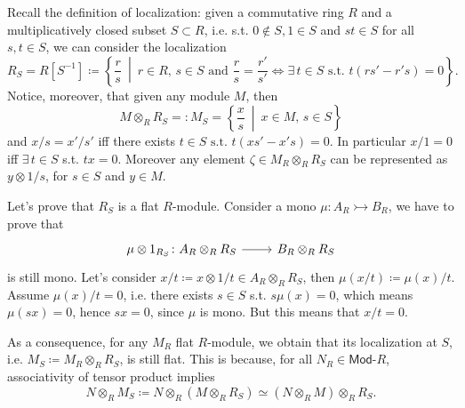 \begin{ex}
	Recall the definition of localization:
	given a commutative ring $R$ and a multiplicatively closed subset $S \subset R$, 
	i.e. s.t. $0 \notin S, 1 \in S$ and $st \in S$ for all
	$s,t \in S$, 
	we can consider the localization
	\begin{equation}
	R_S = R \left[ S^{-1} \right] \coloneqq
	\left\{ \frac{r}{s} \ \middle|\ r \in R, \, s \in S \text{ and } \frac{r}{s} = \frac{r'}{s'}
	\iff \exists\, t \in S \text{ s.t. } t \left( rs' - r's \right) = 0 \right\}
	.\end{equation} 
	Notice, moreover, that given any module $M$, then
	\begin{equation}
	M \otimes_R R_S =: M_S =
	\left\{ \frac{x}{s} \ \middle|\ x \in M, \, s \in S \right\}
	\end{equation} 
	and $x/s = x'/s'$ iff there exists $t \in S \text{ s.t. } t \left( xs' - x's \right) = 0$.
	In particular $x/1 = 0$ iff $\exists\, t \in S$ s.t. $tx = 0$.
	Moreover any element $\zeta \in M_R \otimes_R R_S$ can be represented as
	$y \otimes 1/s$, for $s \in S$ and $y \in M$.

	Let's prove that $R_S$ is a flat $R$-module.
	Consider a mono $\mu\colon A_R \rightarrowtail B_R$, we have to prove that
	\begin{equation*}
	\begin{tikzcd}[row sep = 0ex
		,/tikz/column 1/.append style={anchor=base east}
		,/tikz/column 2/.append style={anchor=base west}]
		\mu \otimes 1_{R_S}\colon A_R \otimes_R R_S \arrow[r, "", rightarrow] &
		B_R \otimes_R R_S
	\end{tikzcd}
	\end{equation*} 
	is still mono.
	Let's consider $x/t \coloneqq x \otimes 1/t \in A_R \otimes_R R_S$, then 
	$\mu(x/t) \coloneqq \mu(x)/t$.
	Assume $\mu(x)/t = 0$, i.e. there exists $s \in S$ s.t. $s \mu(x) = 0$,
	which means $\mu(sx) = 0$, hence $sx = 0$, since $\mu$ is mono.
	But this means that $x/t = 0$.

	As a consequence, for any $M_R$ flat $R$-module, we obtain that its localization
	at $S$, i.e. $M_S \coloneqq M_R \otimes_R R_S$, is still flat.
	This is because, for all $N_R \in \mathsf{Mod}\text{-}R$, associativity of
	tensor product implies
	\begin{equation*}
	N \otimes_R M_S \coloneqq
	N \otimes_R \left( M \otimes_R R_S \right) \simeq
	\left( N \otimes_R M \right) \otimes_R R_S
	.\end{equation*}
\end{ex}

